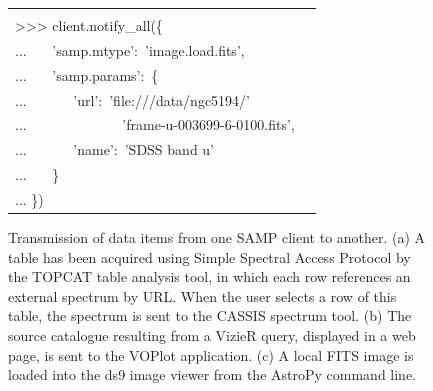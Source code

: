 \documentclass[5p]{elsarticle}
\begin{document}
\begin{figure}
\begin{center}
\begin{tabular}{lc}
\begin{picture}
{{{\begin{minipage}[b]{0cm}
\begin{tabbing}
{\color{gray}>>>} {\color{darkgray}client}.{\color{darkgray}connect}() \\
{\color{gray}>>>} {\color{darkgray}client}.{\color{darkgray}notify\_all}(\{ \\
{\color{gray}...} \ \ \ {\color{blue}'samp.mtype'}:\ {\color{blue}'image.load.fits'}, \\
{\color{gray}...} \ \ \ {\color{blue}'samp.params'}:\ \{ \\
{\color{gray}...} \ \ \ \ \ \ {\color{blue}'url'}:\ {\color{blue}'file:///data/ngc5194/'} \\
{\color{gray}...} \ \ \ \ \ \ \ \ \ \ \ \ \ {\color{blue}'frame-u-003699-6-0100.fits'}, \\
{\color{gray}...} \ \ \ \ \ \ {\color{blue}'name'}:\ {\color{blue}'SDSS band u'} \\
{\color{gray}...} \ \ \ \} \\
{\color{gray}...} \})
\end{tabbing}
\end{minipage}}}
\hspace*{2mm}
}
\end{picture}
\end{tabular}
\end{center}
\caption{\label{fig:transmit}
Transmission of data items from one SAMP client to another.
(a) A table has been acquired using Simple Spectral Access Protocol
by the TOPCAT table analysis tool, in which each row references
an external spectrum by URL.  When the user selects a row of this
table, the spectrum is sent to the CASSIS spectrum tool.
(b) The source catalogue resulting from a VizieR query,
displayed in a web page, is sent to the VOPlot application.
(c) A local FITS image is loaded into the ds9 image viewer
from the AstroPy command line.
}
\end{figure}
\end{document}

